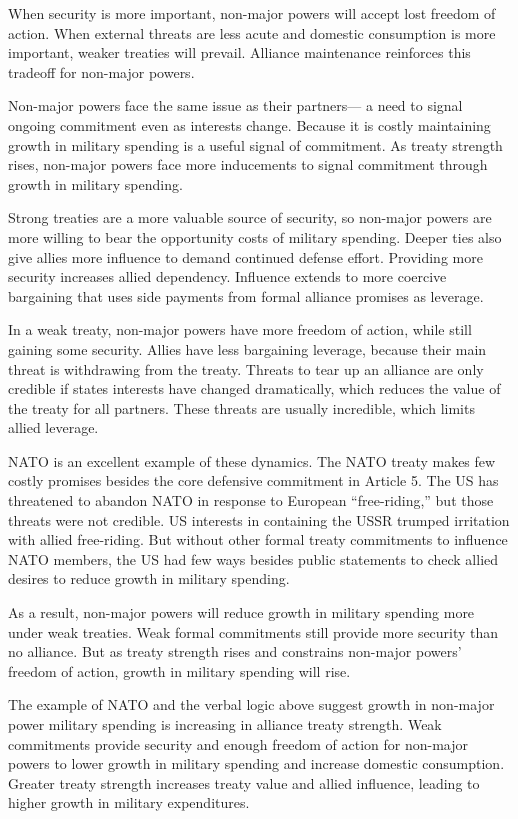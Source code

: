 \documentclass[12pt]{article}
\begin{document}
When security is more important, non-major powers will accept lost freedom of action.
When external threats are less acute and domestic consumption is more important, weaker treaties will prevail. 
Alliance maintenance reinforces this tradeoff for non-major powers. 


Non-major powers face the same issue as their partners--- a need to signal ongoing commitment even as interests change. 
Because it is costly maintaining growth in military spending is a useful signal of commitment. 
As treaty strength rises, non-major powers face more inducements to signal commitment through growth in military spending.

 
Strong treaties are a more valuable source of security, so non-major powers are more willing to bear the opportunity costs of military spending. 
Deeper ties also give allies more influence to demand continued defense effort. 
Providing more security increases allied dependency. 
Influence extends to more coercive bargaining that uses side payments from formal alliance promises as leverage. 


In a weak treaty, non-major powers have more freedom of action, while still gaining some security.  
Allies have less bargaining leverage, because their main threat is withdrawing from the treaty. 
Threats to tear up an alliance are only credible if states interests have changed dramatically, which reduces the value of the treaty for all partners. 
These threats are usually incredible, which limits allied leverage. 


NATO is an excellent example of these dynamics. 
The NATO treaty makes few costly promises besides the core defensive commitment in Article 5.
The US has threatened to abandon NATO in response to European ``free-riding,'' but those threats were not credible. 
US interests in containing the USSR trumped irritation with allied free-riding.  
But without other formal treaty commitments to influence NATO members, the US had few ways besides public statements to check allied desires to reduce growth in military spending. 


As a result, non-major powers will reduce growth in military spending more under weak treaties. 
Weak formal commitments still provide more security than no alliance. 
But as treaty strength rises and constrains non-major powers' freedom of action, growth in military spending will rise. 


The example of NATO and the verbal logic above suggest growth in non-major power military spending is increasing in alliance treaty strength. 
Weak commitments provide security and enough freedom of action for non-major powers to lower growth in military spending and increase domestic consumption. 
Greater treaty strength increases treaty value and allied influence, leading to higher growth in military expenditures. 
\end{document}
